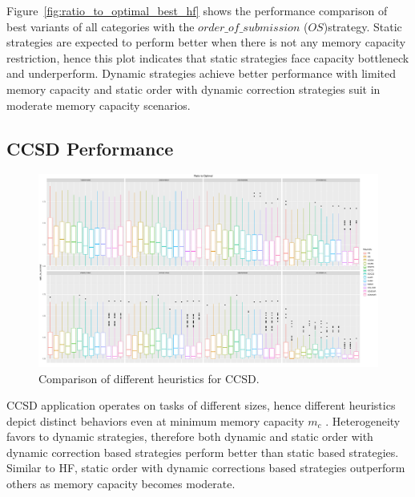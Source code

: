 \documentclass[sigconf]{acmart}
\begin{document}
{	
	Figure~\ref{fig:ratio_to_optimal_best_hf} shows the performance comparison of best variants of all categories with the $order\_of\_submission$ ($OS$)strategy. Static strategies are expected to perform better when there is not any memory capacity restriction, hence this plot indicates that static strategies face capacity bottleneck and underperform. Dynamic strategies achieve better performance with limited memory capacity and static order with dynamic correction strategies suit in moderate memory capacity scenarios.
	
	\subsection{CCSD Performance}
	
	\begin{figure}[htb]
		\includegraphics[scale=0.25]{./results/plots/ratio_to_optimal_selected_ccsd.pdf}
		\caption{Comparison of different heuristics for CCSD.}
		\label{fig:ratio_to_optimal_ccsd}
	\end{figure}	
	
	CCSD application operates on tasks of different sizes, hence different heuristics depict distinct behaviors even at minimum memory capacity $m_c$ . Heterogeneity favors to dynamic strategies, therefore both dynamic and static order with dynamic correction based strategies perform better than  static based strategies. Similar to HF,  static order with dynamic corrections based strategies outperform others as memory capacity becomes moderate. 
	
}
\end{document}
